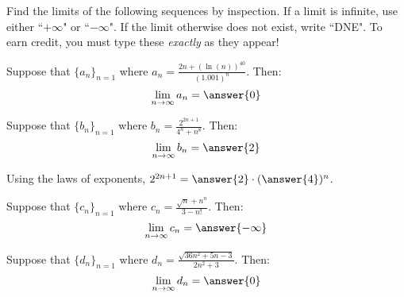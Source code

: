 \documentclass{ximera}
\author{Jim Talamo}
\begin{document}
\begin{exercise}

Find the limits of the following sequences by inspection.  If a limit is infinite, use either ``$+\infty$" or ``$-\infty$".  If the limit otherwise does not exist, write ``DNE".  To earn credit, you must type these \emph{exactly} as they appear!

\begin{exercise}
Suppose that $\{a_n \}_{n=1}$ where $a_n = \frac{2n+(\ln(n))^{40}}{(1.001)^n}$.  Then:
\[
\lim_{n \to \infty} a_n = \answer{0}
\]
\end{exercise}

\begin{exercise}
Suppose that $\{b_n \}_{n=1}$ where $b_n = \frac{2^{2n+1}}{4^n+n^8}$.  Then:
\[
\lim_{n \to \infty} b_n = \answer{2}
\]
\begin{hint}
Using the laws of exponents, $2^{2n+1} = \answer{2} \cdot (\answer{4})^n$.
\end{hint}
\end{exercise}

\begin{exercise}
Suppose that $\{c_n \}_{n=1}$ where $c_n = \frac{\sqrt{n} +n^n}{3-n!}$.  Then:
\[
\lim_{n \to \infty} c_n = \answer{-\infty}
\]
\end{exercise}

\begin{exercise}
Suppose that $\{d_n \}_{n=1}$ where $d_n = \frac{\sqrt{36n^2+5n-3}}{2n^2+3}$.  Then:
\[
\lim_{n \to \infty} d_n =  \answer{0}
\]
\end{exercise}


\end{exercise}
\end{document}
